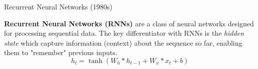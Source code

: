\documentclass[10pt]{beamer}
\begin{document}
\begin{frame}[fragile]{Recurrent Neural Networks (1980s)}

	\textbf{Recurrent Neural Networks (RNNs)} are a class of neural networks designed for processing sequential
	data. The key differentiator with RNNs is the \textit{hidden state} which capture information (context) about
	the sequence so far, enabling them to "remember" previous inputs.
	\begin{equation}
		h_t = \tanh(W_h * h_{t-1} + W_x * x_t + b)
	\end{equation}












\end{frame}
\end{document}
